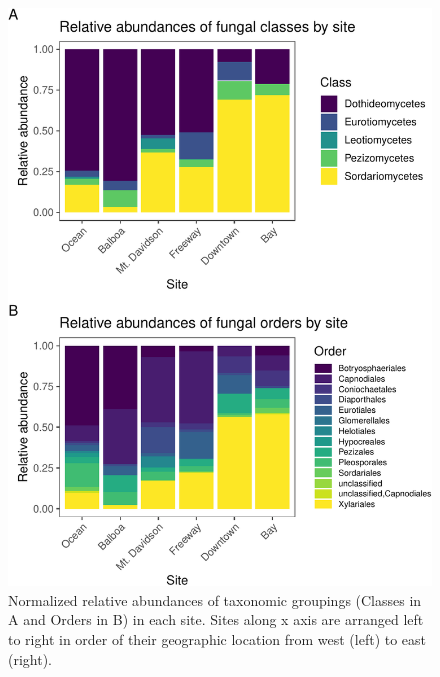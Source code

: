 \documentclass[fleqn,10pt,lineno]{wlpeerj} %
\begin{document}
\begin{figure}
\centering
\includegraphics{gibson2023_files/figure-latex/taxonomy-by-site-plot-1.pdf}
\caption{\label{fig:taxonomy-by-site-plot}Normalized relative abundances of taxonomic groupings (Classes in A and Orders in B) in each site. Sites along x axis are arranged left to right in order of their geographic location from west (left) to east (right).}
\end{figure}
\end{document}
